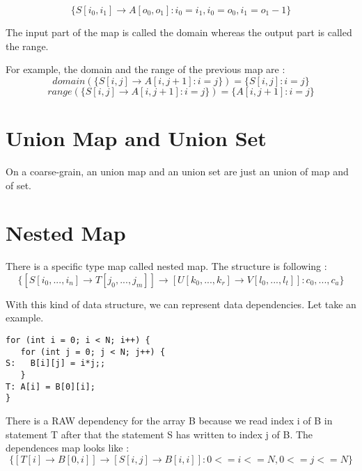 \[
\{S[i_0,i_1] \rightarrow A[o_0,o_1]:i_0=i_1,i_0=o_0,i_1=o_1-1\}
\]

The input part of the map is called the domain whereas the output part is called the range. 

For example, the domain and the range of the previous map are :
\[
domain(\{S[i,j] \rightarrow A[i,j+1]:i=j\})=\{S[i,j]:i=j\} 
\]
\[
range(\{S[i,j] \rightarrow A[i,j+1]:i=j\})=\{A[i,j+1]:i=j\}
\]

\section{Union Map and Union Set}
On a coarse-grain, an union map and an union set are just an union of map and of set.

\section{Nested Map}
There is a specific type map called nested map. The structure is following : 
\[
\{[S[i_0,...,i_n] \rightarrow T[j_0,...,j_m]] \rightarrow [U[k_0,...,k_r] \rightarrow V[l_0,...,l_t]]:c_0,...,c_a\}
\]

With this kind of data structure, we can represent data dependencies. Let take an example.

\begin{lstlisting}[frame=single]
for (int i = 0; i < N; i++) {
   for (int j = 0; j < N; j++) {
S:   B[i][j] = i*j;;
   }
T: A[i] = B[0][i];
}
\end{lstlisting}

There is a RAW dependency for the array B because we read index i of B in statement T after that the statement S has written to index j of B. The dependences map looks like :
\[
\{[T[i] \rightarrow B[0,i]] \rightarrow [S[i,j] \rightarrow B[i,i]]:0<=i<=N,0<=j<=N\}
\]

